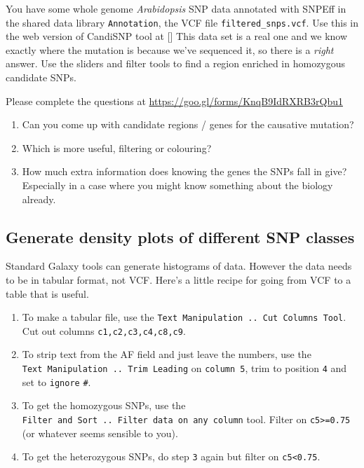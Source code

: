 \documentclass[12pt,]{book}
\providecommand{\tightlist}{%
  \setlength{\itemsep}{0pt}\setlength{\parskip}{0pt}}
\begin{document}
You have some whole genome \emph{Arabidopsis} SNP data annotated with
SNPEff in the shared data library \texttt{Annotation}, the VCF file
\texttt{filtered\_snps.vcf}. Use this in the web version of CandiSNP
tool at {[}{]} This data set is a real one and we know exactly where the
mutation is because we've sequenced it, so there is a \emph{right}
answer. Use the sliders and filter tools to find a region enriched in
homozygous candidate SNPs.

Please complete the questions at
\url{https://goo.gl/forms/KnqB9IdRXRB3rQbu1}

\begin{enumerate}
\def\labelenumi{\arabic{enumi}.}
\tightlist
\item
  Can you come up with candidate regions / genes for the causative
  mutation?
\item
  Which is more useful, filtering or colouring?
\item
  How much extra information does knowing the genes the SNPs fall in
  give? Especially in a case where you might know something about the
  biology already.
\end{enumerate}

\subsection{Generate density plots of different SNP
classes}\label{generate-density-plots-of-different-snp-classes}

Standard Galaxy tools can generate histograms of data. However the data
needs to be in tabular format, not VCF. Here's a little recipe for going
from VCF to a table that is useful.

\begin{enumerate}
\def\labelenumi{\arabic{enumi}.}
\tightlist
\item
  To make a tabular file, use the
  \texttt{Text\ Manipulation\ ..\ Cut\ Columns\ Tool}. Cut out columns
  \texttt{c1,c2,c3,c4,c8,c9}.
\item
  To strip text from the AF field and just leave the numbers, use the
  \texttt{Text\ Manipulation\ ..\ Trim\ Leading} on \texttt{column\ 5},
  trim to position \texttt{4} and set to \texttt{ignore} \texttt{\#}.
\item
  To get the homozygous SNPs, use the
  \texttt{Filter\ and\ Sort\ ..\ Filter\ data\ on\ any\ column} tool.
  Filter on \texttt{c5\textgreater{}=0.75} (or whatever seems sensible
  to you).
\item
  To get the heterozygous SNPs, do step \texttt{3} again but filter on
  \texttt{c5\textless{}0.75}.
\end{enumerate}
\end{document}
